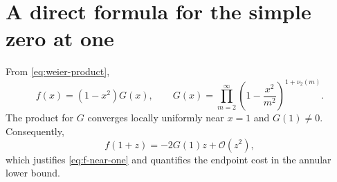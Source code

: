 \documentclass[11pt,oneside]{article}
\theoremstyle{definition}
\theoremstyle{remark}
\newcommand{\bigO}{\mathcal O}
\newcommand{\vtwo}{\nu_2}
\begin{document}
\section{A direct formula for the simple zero at one}

From \eqref{eq:weier-product},
\begin{equation}
 f(x)=(1-x^2)G(x),
 \qquad
 G(x)=\prod_{m=2}^{\infty}
 \left(1-\frac{x^2}{m^2}\right)^{1+\vtwo(m)}.              \label{eq:G-near-one}
\end{equation}
The product for $G$ converges locally uniformly near $x=1$ and $G(1)\ne0$.
Consequently,
\begin{equation}
 f(1+z)=-2G(1)z+\bigO(z^2),                                \label{eq:simple-zero}
\end{equation}
which justifies \eqref{eq:f-near-one} and quantifies the endpoint cost in the
annular lower bound.
\end{document}
